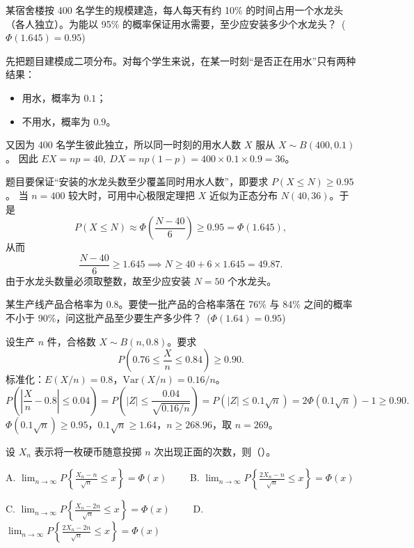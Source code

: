 ﻿\documentclass[lang=cn,11pt]{elegantbook}
\begin{document}
\begin{exercise}\label{exer:5-clt-tap}
某宿舍楼按 400 名学生的规模建造，每人每天有约 10\% 的时间占用一个水龙头（各人独立）。为能以 95\% 的概率保证用水需要，至少应安装多少个水龙头？\ (\(\Phi(1.645) = 0.95\))
\end{exercise}
\begin{solution}
先把题目建模成二项分布。对每个学生来说，在某一时刻“是否正在用水”只有两种结果：
\begin{itemize}
    \item 用水，概率为 \(0.1\)；
    \item 不用水，概率为 \(0.9\)。
\end{itemize}
又因为 400 名学生彼此独立，所以同一时刻的用水人数 \(X\) 服从 \(X\sim B(400,0.1)\)。
因此 \(EX=np=40,\ DX=np(1-p)=400\times 0.1\times 0.9=36\)。

题目要保证“安装的水龙头数至少覆盖同时用水人数”，即要求 \(P(X\le N)\ge 0.95\)。
当 \(n=400\) 较大时，可用中心极限定理把 \(X\) 近似为正态分布 \(N(40,36)\)。于是
\[
P(X \leq N) \approx \Phi\!\left(\frac{N - 40}{6}\right) \geq 0.95 = \Phi(1.645),
\]
从而
\[
\frac{N-40}{6}\ge 1.645 \implies N\ge 40+6\times 1.645=49.87.
\]
由于水龙头数量必须取整数，故至少应安装 \(N=50\) 个水龙头。
\end{solution}

\begin{exercise}\label{exer:5-clt-quality}
某生产线产品合格率为 0.8。要使一批产品的合格率落在 76\% 与 84\% 之间的概率不小于 90\%，问这批产品至少要生产多少件？\ (\(\Phi(1.64) = 0.95\))
\end{exercise}
\begin{solution}
设生产 \(n\) 件，合格数 \(X \sim B(n, 0.8)\)。要求
\[
P\!\left(0.76 \leq \frac{X}{n} \leq 0.84\right) \geq 0.90.
\]
标准化：\(E(X/n) = 0.8\)，\(\mathrm{Var}(X/n) = 0.16/n\)。
\[
P\!\left(\left|\frac{X}{n} - 0.8\right| \leq 0.04\right)
= P\!\left(|Z| \leq \frac{0.04}{\sqrt{0.16/n}}\right)
= P(|Z| \leq 0.1\sqrt{n}) = 2\Phi(0.1\sqrt{n}) - 1 \geq 0.90.
\]
\(\Phi(0.1\sqrt{n}) \geq 0.95\)，\(0.1\sqrt{n} \geq 1.64\)，\(n \geq 268.96\)，取 \(n = 269\)。
\end{solution}


\begin{exercise}\label{exer:5-dml-coin}
设 \(X_n\) 表示将一枚硬币随意投掷 \(n\) 次出现正面的次数，则（\quad）。\par
A. \(\displaystyle\lim_{n\to\infty} P\!\left\{\frac{X_n - n}{\sqrt{n}} \leq x\right\} = \Phi(x)\)~~~~
B. \(\displaystyle\lim_{n\to\infty} P\!\left\{\frac{2X_n - n}{\sqrt{n}} \leq x\right\} = \Phi(x)\)\par
C. \(\displaystyle\lim_{n\to\infty} P\!\left\{\frac{X_n - 2n}{\sqrt{n}} \leq x\right\} = \Phi(x)\)~~~~
D. \(\displaystyle\lim_{n\to\infty} P\!\left\{\frac{2X_n - 2n}{\sqrt{n}} \leq x\right\} = \Phi(x)\)
\end{exercise}
\end{document}
